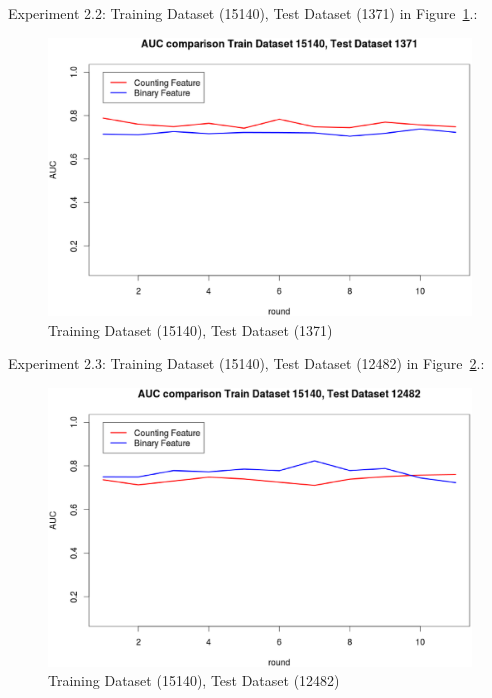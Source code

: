 \documentclass{sig-alternate}
\begin{document}
Experiment 2.2: Training Dataset  (15140), Test Dataset  (1371) in Figure~\ref{fig:fig4}.:
\begin{figure}[h]
\centering
\includegraphics[width=\columnwidth]{15140_1371.eps}
\caption{Training Dataset  (15140), Test Dataset  (1371)}
\label{fig:fig4}
\end{figure}

Experiment 2.3: Training Dataset  (15140), Test Dataset  (12482) in Figure~\ref{fig:fig5}.:
\begin{figure}[h]
\centering
\includegraphics[width=\columnwidth]{15140_12482.eps}
\caption{Training Dataset  (15140), Test Dataset  (12482) }
\label{fig:fig5}
\end{figure}
\end{document}
